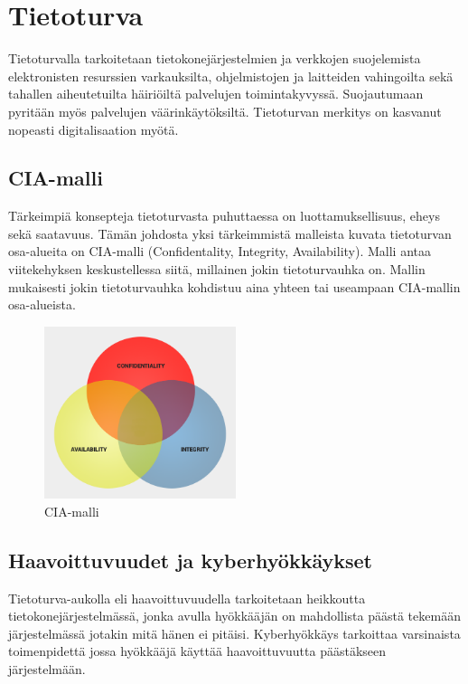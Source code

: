 \chapter{Tietoturva}\label{tietoturva}

Tietoturvalla tarkoitetaan tietokonejärjestelmien ja verkkojen suojelemista elektronisten resurssien varkauksilta, ohjelmistojen ja laitteiden vahingoilta sekä tahallen aiheutetuilta häiriöiltä palvelujen toimintakyvyssä. Suojautumaan pyritään myös palvelujen väärinkäytöksiltä. Tietoturvan merkitys on kasvanut nopeasti digitalisaation myötä.~\cite{definitionofcyber}

\section{CIA-malli}\label{cia_malli}

Tärkeimpiä konsepteja tietoturvasta puhuttaessa on luottamuksellisuus, eheys sekä saatavuus. Tämän johdosta yksi tärkeimmistä malleista kuvata tietoturvan osa-alueita on CIA-malli (Confidentality, Integrity, Availability). Malli antaa viitekehyksen keskustellessa siitä, millainen jokin tietoturvauhka on. Mallin mukaisesti jokin tietoturvauhka kohdistuu aina yhteen tai useampaan CIA-mallin osa-alueista.~\cite{basicsofinformationsecurity}

\begin{figure}
\centering \includegraphics[width=0.5\textwidth]{kuvat/cia.png}
\caption{CIA-malli}
\label{cia} 
\end{figure}

\section{Haavoittuvuudet ja kyberhyökkäykset}\label{haavoittuvuudet_ja_kyberhyokkaykset}
Tietoturva-aukolla eli haavoittuvuudella tarkoitetaan heikkoutta tietokonejärjestelmässä, jonka avulla hyökkääjän on mahdollista päästä tekemään järjestelmässä jotakin mitä hänen ei pitäisi. Kyberhyökkäys tarkoittaa varsinaista toimenpidettä jossa hyökkääjä käyttää haavoittuvuutta päästäkseen järjestelmään.~\cite{nist}

